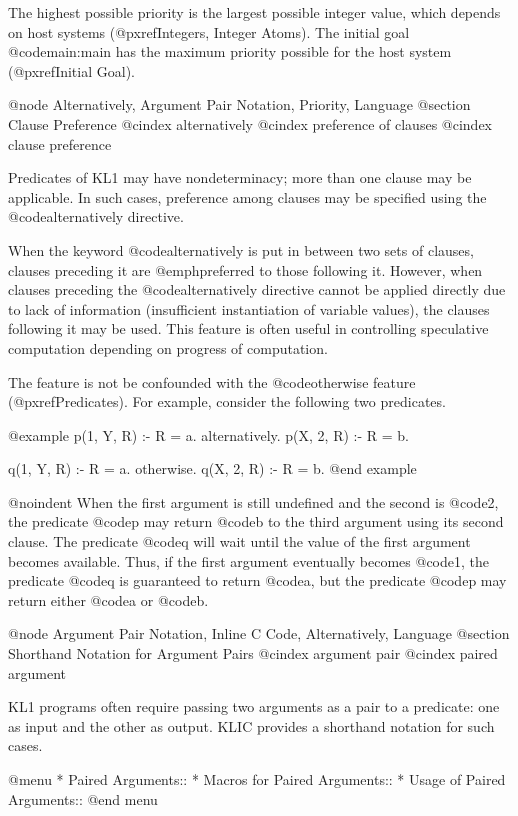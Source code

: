 The highest possible priority is the largest possible integer value,
which depends on host systems (@pxref{Integers, Integer Atoms}).  The
initial goal @code{main:main} has the maximum priority possible for the
host system (@pxref{Initial Goal}).

@node Alternatively, Argument Pair Notation, Priority, Language
@section Clause Preference
@cindex alternatively
@cindex preference of clauses
@cindex clause preference

Predicates of KL1 may have nondeterminacy; more than one clause may be
applicable.  In such cases, preference among clauses may be specified
using the @code{alternatively} directive.

When the keyword @code{alternatively} is put in between two sets of
clauses, clauses preceding it are @emph{preferred} to those following
it.  However, when clauses preceding the @code{alternatively} directive
cannot be applied directly due to lack of information (insufficient
instantiation of variable values), the clauses following it may be
used.  This feature is often useful in controlling speculative
computation depending on progress of computation.

The feature is not be confounded with the @code{otherwise} feature
(@pxref{Predicates}).  For example, consider the following two
predicates.

@example
p(1, Y, R) :- R = a.
alternatively.
p(X, 2, R) :- R = b.

q(1, Y, R) :- R = a.
otherwise.
q(X, 2, R) :- R = b.
@end example

@noindent
When the first argument is still undefined and the second is @code{2},
the predicate @code{p} may return @code{b} to the third argument using
its second clause.  The predicate @code{q} will wait until the value of
the first argument becomes available.  Thus, if the first argument
eventually becomes @code{1}, the predicate @code{q} is guaranteed to
return @code{a}, but the predicate @code{p} may return either @code{a}
or @code{b}.

@node Argument Pair Notation, Inline C Code, Alternatively, Language
@section Shorthand Notation for Argument Pairs
@cindex argument pair
@cindex paired argument

KL1 programs often require passing two arguments as a pair to a
predicate: one as input and the other as output.  KLIC provides a
shorthand notation for such cases.

@menu
* Paired Arguments::            
* Macros for Paired Arguments::  
* Usage of Paired Arguments::   
@end menu

